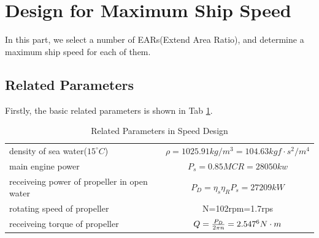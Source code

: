\documentclass[a4paper,UTF8]{article}
\begin{document}
\section{Design for Maximum Ship Speed}
In this part, we select a number of EARs(Extend Area Ratio), and determine a maximum ship speed for each of them.\\

\subsection{Related Parameters}
Firstly, the basic related parameters is shown in Tab \ref{tab:rp}.
\begin{table}
	\centering
	\begin{tabular}{lc}
		\hline
		density of sea water($15^{\circ}C$)&$\rho=1025.91kg/m^3=104.63kgf\cdot s^2/m^4$\\
		main engine power &  $P_s=0.85MCR=28050kw$\\
		receiveing power of propeller in open water & $P_D=\eta_s\eta_RP_s=27209kW$\\
		rotating speed of propeller & N=102rpm=1.7rps\\
		receiveing torque of propeller & $Q=\frac{P_D}{2\pi n}=2.547\time 10^6N\cdot m$\\
		\hline
	\end{tabular}
	\caption{Related Parameters in Speed Design}
	\label{tab:rp}
\end{table}
\end{document}
